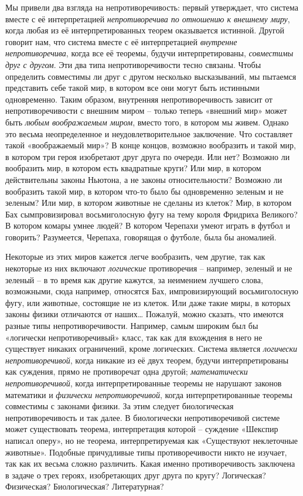 \documentclass[../main.tex]{subfiles}
\begin{document}
Мы привели два взгляда на непротиворечивость: первый утверждает, что система вместе с её интерпретацией \emph{непротиворечива по отношению к внешнему миру}, когда любая из её интерпретированных теорем оказывается истинной. Другой говорит нам, что система вместе с её интерпретацией \emph{внутренне непротиворечива}, когда все её теоремы, будучи интерпретированы, \emph{совместимы друг с другом}. Эти два типа непротиворечивости тесно связаны. Чтобы определить совместимы ли друг с другом несколько высказываний, мы пытаемся представить себе такой мир, в котором все они могут быть истинными одновременно. Таким образом, внутренняя непротиворечивость зависит от непротиворечивости с внешним миром \--- только теперь «внешний мир» может быть \emph{любым воображаемым миром}, вместо того, в котором мы живем. Однако это весьма неопределенное и неудовлетворительное заключение. Что составляет такой «воображаемый мир»? В конце концов, возможно вообразить и такой мир, в котором три героя изобретают друг друга по очереди. Или нет? Возможно ли вообразить мир, в котором есть квадратные круги? Или мир, в котором действительны законы Ньютона, а не законы относительности? Возможно ли вообразить такой мир, в котором что-то было бы одновременно зеленым и не зеленым? Или мир, в котором животные не сделаны из клеток? Мир, в котором Бах сымпровизировал восьмиголосную фугу на тему короля Фридриха Великого? В котором комары умнее людей? В котором Черепахи умеют играть в футбол и говорить? Разумеется, Черепаха, говорящая о футболе, была бы аномалией.

Некоторые из этих миров кажется легче вообразить, чем другие, так как некоторые из них включают \emph{логические} противоречия \--- например, зеленый и не зеленый \--- в то время как другие кажутся, за неимением лучшего слова, возможными, сюда например, относятся Бах, импровизирующий восьмиголосную фугу, или животные, состоящие не из клеток. Или даже такие миры, в которых законы физики отличаются от наших\ldots{} Пожалуй, можно сказать, что имеются разные типы непротиворечивости. Например, самым широким был бы «логически непротиворечивый» класс, так как для вхождения в него не существует никаких ограничений, кроме логических. Система является \emph{логически непротиворечивой}, когда никакие из её двух теорем, будучи интерпретированы как суждения, прямо не противоречат одна другой; \emph{математически непротиворечивой}, когда интерпретированные теоремы не нарушают законов математики и \emph{физически непротиворечивой}, когда интерпретированные теоремы совместимы с законами физики. За этим следует биологическая непротиворечивость и так далее. В биологически непротиворечивой системе может существовать теорема, интерпретация которой \--- суждение «Шекспир написал оперу», но не теорема, интерпретируемая как «Существуют неклеточные животные». Подобные причудливые типы противоречивости никто не изучает, так как их весьма сложно различить. Какая именно противоречивость заключена в задаче о трех героях, изобретающих друг друга по кругу? Логическая? Физическая? Биологическая? Литературная?
\end{document}

